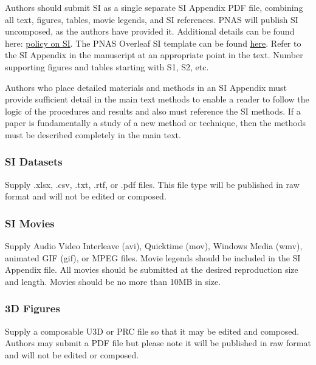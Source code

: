 \documentclass[9pt,twocolumn,twoside,lineno]{pnas-new}
\begin{document}
Authors should submit SI as a single separate SI Appendix PDF file, combining all text, figures, tables, movie legends, and SI references. PNAS will publish SI uncomposed, as the authors have provided it. Additional details can be found here: \href{https://www.pnas.org/page/authors/format#Supporting_Information}{policy on SI}. The PNAS Overleaf SI template can be found \href{https://www.overleaf.com/latex/templates/pnas-template-for-supplementary-information/wqfsfqwyjtsd}{here}. Refer to the SI Appendix in the manuscript at an appropriate point in the text. Number supporting figures and tables starting with S1, S2, etc.

Authors who place detailed materials and methods in an SI Appendix must provide sufficient detail in the main text methods to enable a reader to follow the logic of the procedures and results and also must reference the SI methods. If a paper is fundamentally a study of a new method or technique, then the methods must be described completely in the main text.

\subsubsection*{SI Datasets} 

Supply .xlsx, .csv, .txt, .rtf, or .pdf files. This file type will be published in raw format and will not be edited or composed.


\subsubsection*{SI Movies}

Supply Audio Video Interleave (avi), Quicktime (mov), Windows Media (wmv), animated GIF (gif), or MPEG files. Movie legends should be included in the SI Appendix file. All movies should be submitted at the desired reproduction size and length. Movies should be no more than 10MB in size.


\subsubsection*{3D Figures}

Supply a composable U3D or PRC file so that it may be edited and composed. Authors may submit a PDF file but please note it will be published in raw format and will not be edited or composed.
\end{document}
